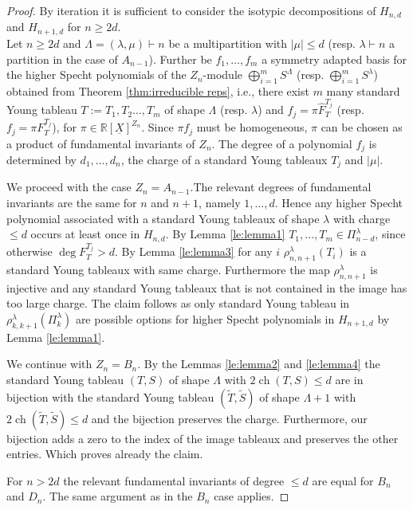 \documentclass[11pt,a4paper]{amsart}
\numberwithin{equation}{section}
\theoremstyle{definition}
\newcommand{\R}{\mathbb{R}}
\DeclareMathOperator{\ch}{ch}
\numberwithin{thm}{section}
\theoremstyle{break}
\numberwithin{subcase}{case}
\begin{document}
\begin{proof}
By iteration it is sufficient to consider the isotypic decompositions of $H_{n,d}$ and $H_{n+1,d}$ for $n \geq 2d$. \\
Let $n \geq 2d$ and $\Lambda=(\lambda,\mu) \vdash n$ be a multipartition with $ |\mu|\leq d$ (resp. $\lambda \vdash n$ a partition in the case of $A_{n-1}$). Further be $f_1,\ldots,f_m$ a symmetry adapted basis for the higher Specht polynomials of the $Z_n$-module $\bigoplus_{i=1}^m S^\Lambda$ (resp. $\bigoplus_{i=1}^m S^\lambda$) obtained from Theorem \ref{thm:irreducible reps}, i.e., there exist $m$ many standard Young tableau $T:=T_1,T_2\ldots,T_m$ of shape $\Lambda$ (resp. $\lambda$) and $f_j = \pi \widehat{F}_{T}^{T_j}$ (resp. $f_j = \pi F_T^{T_j}$), for $\pi \in \R[\underline{X}]^{Z_n}$. Since $\pi f_j$ must be homogeneous, $\pi$ can be chosen as a product of fundamental invariants of $Z_n$. The degree of a polynomial $f_j$ is determined by $d_1,\ldots,d_n$, the charge of a standard Young tableaux $T_j$ and $|\mu|$.

We proceed with the case $Z_n=A_{n-1}$.The relevant degrees of fundamental invariants are the same for $n$ and $n+1$, namely $1,\ldots,d$. Hence any higher Specht polynomial associated with a standard Young tableaux of shape $\lambda$ with charge $\leq d$ occurs at least once in $H_{n,d}$. By Lemma \ref{le:lemma1} $T_1,\ldots,T_m \in \Pi_{n-d}^\lambda$, since otherwise $\deg F_{T}^{T_j} > d$. By Lemma \ref{le:lemma3} for any $i$  $\rho_{n,n+1}^\lambda(T_i)$ is a standard Young tableaux with same charge. Furthermore the map $\rho_{n,n+1}^\lambda$ is injective and any standard Young tableaux that is not contained in the image has too large charge. The claim follows as only standard Young tableau in $\rho_{k,k+1}^{\lambda}( \Pi_{k}^\lambda)$ are possible options for higher Specht polynomials in $H_{n+1,d}$ by Lemma \ref{le:lemma1}.


We continue with $Z_n=B_n$. By the Lemmas \ref{le:lemma2} and \ref{le:lemma4} the standard Young tableau $(T,S)$ of shape $\Lambda$ with $2 \ch (T,S) \leq d $ are in bijection with the standard Young tableau $(\widetilde{T},\widetilde{S})$ of shape $\Lambda +1$ with $ 2 \ch (\widetilde{T},\widetilde{S}) \leq d$ and the bijection preserves the charge. Furthermore, our bijection adds a zero to the index of the image tableaux and preserves the other entries. Which proves already the claim.

For $n > 2d$ the relevant fundamental invariants of degree $\leq d$ are equal for $B_n$ and $D_n$. The same argument as in the $B_n$ case applies. 
\end{proof}
\end{document}
